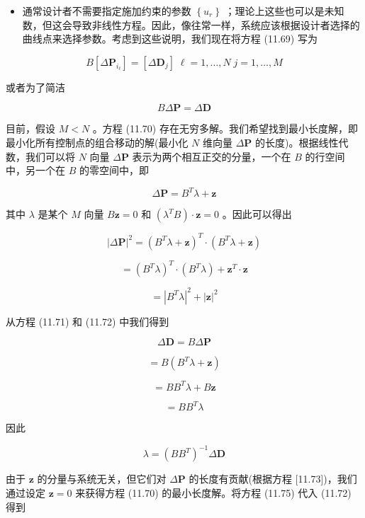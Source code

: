 \documentclass[../main.tex]{subfiles}
\begin{document}
\begin{itemize}
\item 通常设计者不需要指定施加约束的参数 \(\left\{  {u}_{r}\right\}\) ；理论上这些也可以是未知数，但这会导致非线性方程。因此，像往常一样，系统应该根据设计者选择的曲线点来选择参数。考虑到这些说明，我们现在将方程 (11.69) 写为
\end{itemize}

\[
B\left\lbrack  {\Delta {\mathbf{P}}_{{i}_{\ell }}}\right\rbrack   = \left\lbrack  {\Delta {\mathbf{D}}_{j}}\right\rbrack  \;\ell  = 1,\ldots ,N\;j = 1,\ldots ,M \tag{11.70}
\]

或者为了简洁

\[
{B\Delta }\mathbf{P} = \Delta \mathbf{D} \tag{11.71}
\]

目前，假设 \(M < N\) 。方程 (11.70) 存在无穷多解。我们希望找到最小长度解，即最小化所有控制点的组合移动的解(最小化 \(N\) 维向量 \(\Delta \mathbf{P}\) 的长度)。根据线性代数，我们可以将 \(N\) 向量 \(\Delta \mathbf{P}\) 表示为两个相互正交的分量，一个在 \(B\) 的行空间中，另一个在 \(B\) 的零空间中，即

\[
\Delta \mathbf{P} = {B}^{T}\lambda  + \mathbf{z} \tag{11.72}
\]

其中 \(\lambda\) 是某个 \(M\) 向量 \(B\mathbf{z} = 0\) 和 \(\left( {{\lambda }^{T}B}\right)  \cdot  \mathbf{z} = 0\) 。因此可以得出

\[
{\left| \Delta \mathbf{P}\right| }^{2} = {\left( {B}^{T}\lambda  + \mathbf{z}\right) }^{T} \cdot  \left( {{B}^{T}\lambda  + \mathbf{z}}\right)
\]

\[
= {\left( {B}^{T}\lambda \right) }^{T} \cdot  \left( {{B}^{T}\lambda }\right)  + {\mathbf{z}}^{T} \cdot  \mathbf{z}
\]

\[
= {\left| {B}^{T}\lambda \right| }^{2} + {\left| \mathbf{z}\right| }^{2} \tag{11.73}
\]

从方程 (11.71) 和 (11.72) 中我们得到

\[
\Delta \mathbf{D} = {B\Delta }\mathbf{P}
\]

\[
= B\left( {{B}^{T}\lambda  + \mathbf{z}}\right)
\]

\[
= B{B}^{T}\lambda  + B\mathbf{z}
\]

\[
= B{B}^{T}\lambda  \tag{11.74}
\]

因此

\[
\lambda  = {\left( B{B}^{T}\right) }^{-1}\Delta \mathbf{D} \tag{11.75}
\]

由于 \(\mathbf{z}\) 的分量与系统无关，但它们对 \(\Delta \mathbf{P}\) 的长度有贡献(根据方程 [11.73])，我们通过设定 \(\mathbf{z} = 0\) 来获得方程 (11.70) 的最小长度解。将方程 (11.75) 代入 (11.72) 得到
\end{document}
